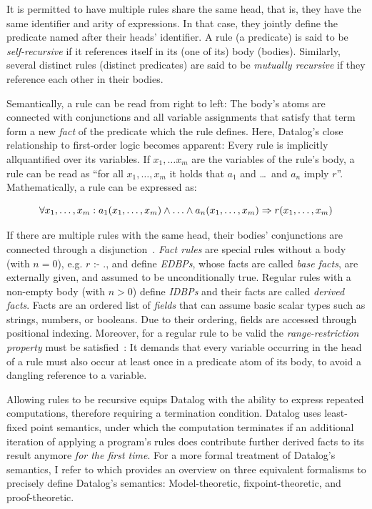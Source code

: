 It is permitted to have multiple rules share the same head, that is,
they have the same identifier and arity of expressions.
In that case, they jointly define the predicate named after their heads' identifier.
A rule (a predicate) is said to be \emph{self-recursive}
if it references itself in its (one of its) body (bodies).
Similarly, several distinct rules (distinct predicates) are said to be
\emph{mutually recursive} if they reference each other in their bodies.

Semantically, a rule can be read from right to left: The body's atoms are
connected with conjunctions and all variable assignments that satisfy that term
form a new \emph{fact} of the predicate which the rule defines.
Here, Datalog's close relationship to first-order logic becomes apparent:
Every rule is implicitly allquantified over its variables.
If \(x_1, \ldots x_m\) are the variables of the rule's body, a rule can be read as
``for all \(x_1, \ldots, x_m\) it holds that \(a_1\) and \ldots\ and \(a_n\) imply \(r\)''.
Mathematically, a rule can be expressed as\footnotemark{}:


\begin{equation}
    \forall x_1, \ldots, x_m: a_1(x_1, \ldots, x_m) \land \ldots \land a_n(x_1, \ldots, x_m) \Rightarrow r(x_1, \ldots, x_m) \\
\end{equation}

If there are multiple rules with the same head, their bodies' conjunctions
are connected through a disjunction~\cite{abo2024convergence}.
\emph{Fact rules} are special rules without a body (with $n=0$), e.g.
\( r \text{ :- } .\), and define \emph{\acp{EDBP}}, whose facts are called
\emph{base facts}, are externally given, and assumed to be unconditionally true.
Regular rules with a non-empty body (with $n>0$) define \emph{\acp{IDBP}}
and their facts are called \emph{derived facts}.
Facts are an ordered list of \emph{fields} that can assume basic scalar
types such as strings, numbers, or booleans.
Due to their ordering, fields are accessed through positional indexing.
Moreover, for a regular rule to be valid the \emph{range-restriction property}
must be satisfied~\cite{green2013datalog}:
It demands that every variable occurring in the head of a rule must also occur
at least once in a predicate atom of its body, to avoid a dangling reference
to a variable.

Allowing rules to be recursive equips Datalog with the ability to express
repeated computations, therefore requiring a termination condition.
Datalog uses least-fixed point semantics, under which the computation terminates
if an additional iteration of applying a program's rules does contribute further
derived facts to its result anymore \emph{for the first time}.
For a more formal treatment of Datalog's semantics, I refer to \cite{green2013datalog}
which provides an overview on three equivalent formalisms to precisely define
Datalog's semantics: Model-theoretic, fixpoint-theoretic, and proof-theoretic.

